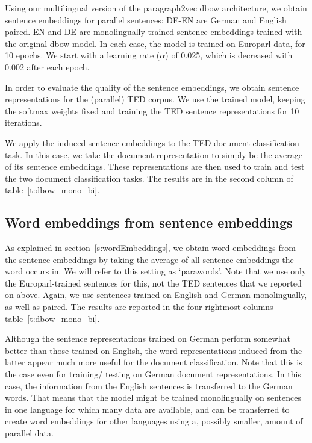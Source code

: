 Using our multilingual version of the paragraph2vec dbow architecture, we obtain sentence embeddings for parallel sentences: DE-EN are German and English paired. EN and DE are monolingually trained sentence embeddings trained with the original dbow model. In each case, the model is trained on Europarl data, for 10 epochs. We start with a learning rate ($\alpha$) of 0.025, which is decreased with 0.002 after each epoch.

 In order to evaluate the quality of the sentence embeddings, we obtain sentence representations for the (parallel) TED corpus. We use the trained model, keeping the softmax weights fixed and training the TED sentence representations for 10 iterations.

We apply the induced sentence embeddings to the TED document classification task. In this case, we take the document representation to simply be the average of its sentence embeddings. These representations are then used to train and test the two document classification tasks. The results are in the second column of table~\ref{t:dbow_mono_bi}. 




\subsection{Word embeddings from sentence embeddings}

As explained in section~\ref{s:wordEmbeddings}, we obtain word embeddings from the sentence embeddings by taking the average of all sentence embeddings the word occurs in. We will refer to this setting as `parawords'. Note that we use only the Europarl-trained sentences for this, not the TED sentences that we reported on above. Again, we use sentences trained on English and German monolingually, as well as paired. The results are reported in the four rightmost columns table~\ref{t:dbow_mono_bi}.

Although the sentence representations trained on German perform somewhat better than those trained on English, the word representations induced from the latter appear much more useful for the document classification. Note that this is the case even for training/ testing on German document representations. In this case, the information from the English sentences is transferred to the German words. That means that the model might be trained monolingually on sentences in one language for which many data are available, and can be transferred to create word embeddings for other languages using a, possibly smaller, amount of parallel data.

